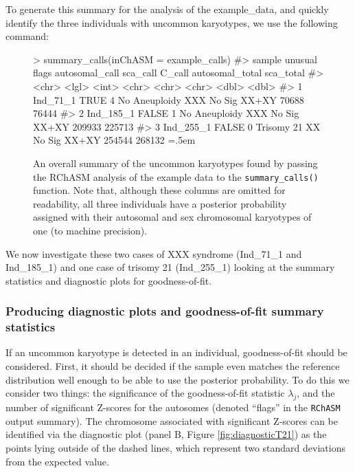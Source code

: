 \documentclass[10pt,a4paper]{article}
\newenvironment{cverbatim1}
 {\SaveVerbatim{cverb}}
 {\endSaveVerbatim
    \relsize{-1}\fboxrule=0pt\fboxsep=.5em
  \colorbox{cverbbg}{\BUseVerbatim{cverb}}%
}
\begin{document}
To generate this summary for the analysis of the example\_data, and quickly identify the three individuals with uncommon karyotypes, we use the following command:

\begin{figure}[H]
\centering 
\begin{cverbatim1}
> summary_calls(inChASM = example_calls)
#>   sample    unusual flags autosomal_call sca_call C_call       autosomal_total sca_total
#>   <chr>     <lgl>   <int> <chr>          <chr>    <chr>                  <dbl>     <dbl>
#> 1 Ind_71_1  TRUE        4 No Aneuploidy  XXX      No Sig XX+XY           70688     76444
#> 2 Ind_185_1 FALSE       1 No Aneuploidy  XXX      No Sig XX+XY          209933    225713
#> 3 Ind_255_1 FALSE       0 Trisomy 21     XX       No Sig XX+XY          254544    268132
\end{cverbatim1}
\caption{An overall summary of the uncommon karyotypes found by passing the RChASM analysis of the example data to the \texttt{summary\_calls()} function. Note that, although these columns are omitted for readability, all three individuals have a posterior probability assigned with their autosomal and sex chromosomal karyotypes of one (to machine precision).}
\label{fig:summary_callsOutput}
\end{figure}

We now investigate these two cases of XXX syndrome (Ind\_71\_1 and Ind\_185\_1) and one case of trisomy 21 (Ind\_255\_1) looking at the summary statistics and diagnostic plots for goodness-of-fit.

\subsubsection{Producing diagnostic plots and goodness-of-fit summary statistics}

If an uncommon karyotype is detected in an individual, goodness-of-fit should be considered. First, it should be decided if the sample even matches the reference distribution well enough to be able to use the posterior probability. To do this we consider two things: the significance of the goodness-of-fit statistic $\lambda_j$, and the number of significant Z-scores for the autosomes (denoted ``flags'' in the \texttt{RChASM} output summary). The chromosome associated with significant Z-scores can be identified via the diagnostic plot (panel B, Figure \ref{fig:diagnosticT21}) as the points lying outside of the dashed lines, which represent two standard deviations from the expected value.
\end{document}
